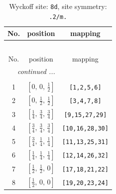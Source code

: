 \documentclass[fleqn,8pt]{jsarticle}
\begin{document}
\begin{longtable}{ccc}
\caption{Wyckoff site: {\tt 8d}, site symmetry: {\tt .2/m.}}
 \\
 \hline \hline
No. & position & mapping \\ \hline \endfirsthead

\multicolumn{2}{l}{\tablename\ \thetable{}} \\
 \hline \hline
No. & position & mapping \\ \hline \endhead

 \hline \hline
\multicolumn{2}{r}{\footnotesize\it continued ...} \\ \endfoot

 \hline \hline
\multicolumn{2}{r}{} \\ \endlastfoot

1 & $\left[ 0,\, 0,\, \frac{1}{2} \right]$ & {\tt [1,2,5,6]} \\ \hline
2 & $\left[ 0,\, \frac{1}{2},\, \frac{1}{2} \right]$ & {\tt [3,4,7,8]} \\ \hline
3 & $\left[ \frac{1}{4},\, \frac{3}{4},\, \frac{3}{4} \right]$ & {\tt [9,15,27,29]} \\ \hline
4 & $\left[ \frac{3}{4},\, \frac{3}{4},\, \frac{3}{4} \right]$ & {\tt [10,16,28,30]} \\ \hline
5 & $\left[ \frac{3}{4},\, \frac{1}{4},\, \frac{1}{4} \right]$ & {\tt [11,13,25,31]} \\ \hline
6 & $\left[ \frac{1}{4},\, \frac{1}{4},\, \frac{1}{4} \right]$ & {\tt [12,14,26,32]} \\ \hline
7 & $\left[ \frac{1}{2},\, \frac{1}{2},\, 0 \right]$ & {\tt [17,18,21,22]} \\ \hline
8 & $\left[ \frac{1}{2},\, 0,\, 0 \right]$ & {\tt [19,20,23,24]} \\
\end{longtable}
\renewcommand{\arraystretch}{1.2}
\end{document}
